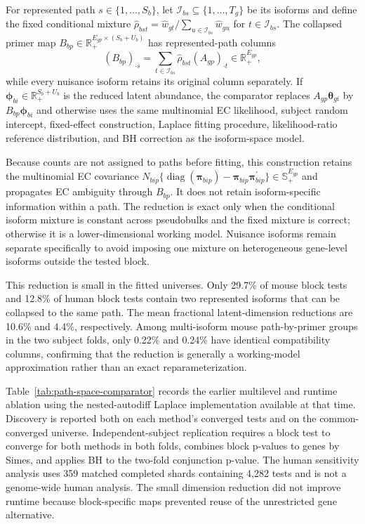 \documentclass[11pt]{article}
\begin{document}
For represented path \(s\in\{1,\ldots,S_b\}\), let \(\mathcal I_{bs}\subseteq\{1,\ldots,T_g\}\) be its isoforms and define the fixed conditional mixture \(\widehat\rho_{bst}=\widehat w_{gt}/\sum_{u\in\mathcal I_{bs}}\widehat w_{gu}\) for \(t\in\mathcal I_{bs}\). The collapsed primer map \(B_{bp}\in\mathbb R_+^{E_{gp}\times(S_b+U_b)}\) has represented-path columns \[(B_{bp})_{\mathbin\cdot s}=\sum_{t\in\mathcal I_{bs}}\widehat\rho_{bst}(A_{gp})_{\mathbin\cdot t}\in\mathbb R_+^{E_{gp}},\] while every nuisance isoform retains its original column separately. If \(\bm\phi_{bi}\in\mathbb R_+^{S_b+U_b}\) is the reduced latent abundance, the comparator replaces \(A_{gp}\bm\theta_{gi}\) by \(B_{bp}\bm\phi_{bi}\) and otherwise uses the same multinomial EC likelihood, subject random intercept, fixed-effect construction, Laplace fitting procedure, likelihood-ratio reference distribution, and BH correction as the isoform-space model.

Because counts are not assigned to paths before fitting, this construction retains the multinomial EC covariance \(N_{bip}\{\operatorname{diag}(\bm\pi_{bip})-\bm\pi_{bip}\bm\pi_{bip}^\prime\}\in\mathbb S_+^{E_{gp}}\) and propagates EC ambiguity through \(B_{bp}\). It does not retain isoform-specific information within a path. The reduction is exact only when the conditional isoform mixture is constant across pseudobulks and the fixed mixture is correct; otherwise it is a lower-dimensional working model. Nuisance isoforms remain separate specifically to avoid imposing one mixture on heterogeneous gene-level isoforms outside the tested block.

This reduction is small in the fitted universes. Only 29.7\% of mouse block tests and 12.8\% of human block tests contain two represented isoforms that can be collapsed to the same path. The mean fractional latent-dimension reductions are 10.6\% and 4.4\%, respectively. Among multi-isoform mouse path-by-primer groups in the two subject folds, only 0.22\% and 0.24\% have identical compatibility columns, confirming that the reduction is generally a working-model approximation rather than an exact reparameterization.

Table~\ref{tab:path-space-comparator} records the earlier multilevel and runtime ablation using the nested-autodiff Laplace implementation available at that time. Discovery is reported both on each method's converged tests and on the common-converged universe. Independent-subject replication requires a block test to converge for both methods in both folds, combines block p-values to genes by Simes, and applies BH to the two-fold conjunction p-value. The human sensitivity analysis uses 359 matched completed shards containing 4,282 tests and is not a genome-wide human analysis. The small dimension reduction did not improve runtime because block-specific maps prevented reuse of the unrestricted gene alternative.
\end{document}
